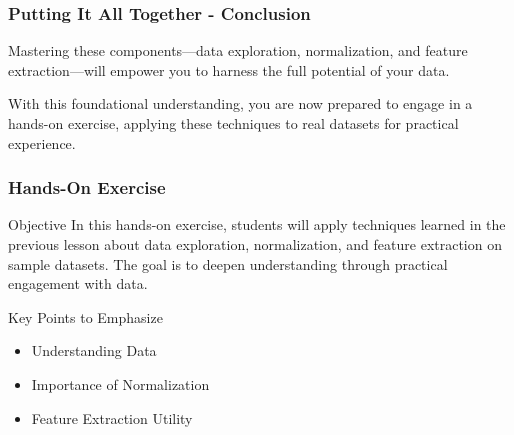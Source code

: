 \documentclass[aspectratio=169]{beamer}
\begin{document}
\begin{frame}[fragile]
    \frametitle{Putting It All Together - Conclusion}
    Mastering these components—data exploration, normalization, and feature extraction—will empower you to harness the full potential of your data.
    
    With this foundational understanding, you are now prepared to engage in a hands-on exercise, applying these techniques to real datasets for practical experience.
\end{frame}

\begin{frame}[fragile]
    \frametitle{Hands-On Exercise}
    \begin{block}{Objective}
        In this hands-on exercise, students will apply techniques learned in the previous lesson about data exploration, normalization, and feature extraction on sample datasets. 
        The goal is to deepen understanding through practical engagement with data.
    \end{block}
    
    \begin{block}{Key Points to Emphasize}
        \begin{itemize}
            \item Understanding Data
            \item Importance of Normalization
            \item Feature Extraction Utility
        \end{itemize}
    \end{block}
\end{frame}
\end{document}
